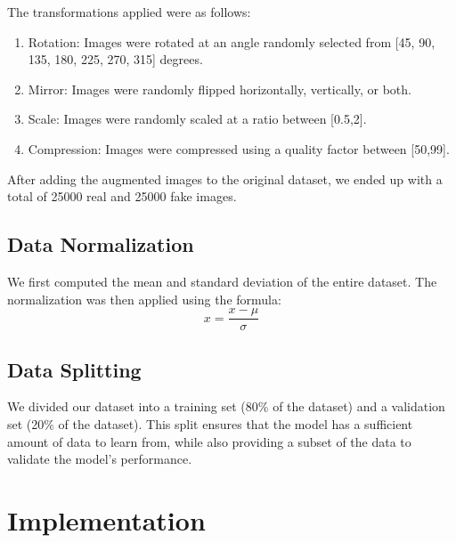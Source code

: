             The transformations applied were as follows:
        \begin{enumerate}
            \item Rotation: Images were rotated at an angle randomly selected from [45, 90, 135, 180, 225, 270, 315] degrees.
            \item Mirror: Images were randomly flipped horizontally, vertically, or both.
            \item Scale: Images were randomly scaled at a ratio between [0.5,2].
            \item Compression: Images were compressed using a quality factor between [50,99].
        \end{enumerate}

        After adding the augmented images to the original dataset, we ended up with a total of 25000 real and 25000 fake images.

        \subsection{Data Normalization}
            We first computed the mean and standard deviation of the entire dataset. The normalization was then applied using the formula: 
            \begin{equation}
            x = \frac{x - \mu}{\sigma}
            \end{equation}

        \subsection{Data Splitting}
            We divided our dataset into a training set (80\% of the dataset) and a validation set (20\% of the dataset). This split ensures that the model has a sufficient amount of data to learn from, while also providing a subset of the data to validate the model's performance.


        \section{Implementation}
        
        
